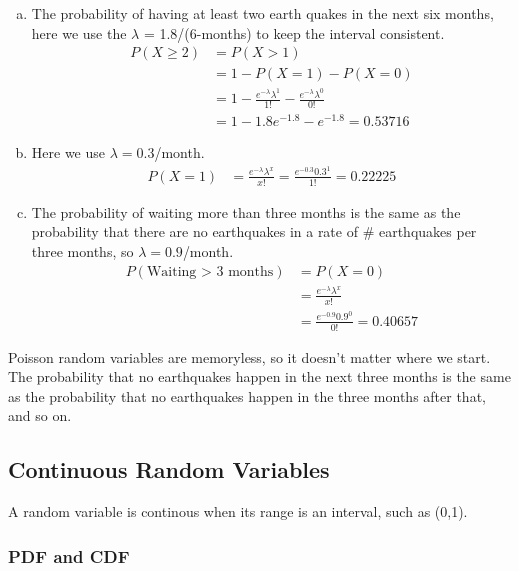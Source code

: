 \documentclass{article}
\begin{document}
\begin{enumerate}[(a)]
\item The probability of having at least two earth quakes in the next six months, here we use the $\lambda$ = 1.8/(6-months) to keep the interval consistent.
\begin{align*}
P(X \geq 2) & = P(X > 1) \\
& = 1 - P(X=1) - P(X = 0) \\
& = 1 - \frac{e^{-\lambda}\lambda^1}{1!} - \frac{e^{-\lambda}\lambda^0}{0!}\\
& = 1 - 1.8e^{-1.8} - e^{-1.8} = \boxed{0.53716}
\end{align*}
\item Here we use $\lambda=0.3$/month. \begin{align*} 
P(X = 1) & =  \frac{e^{-\lambda}\lambda^x}{x!} = \frac{e^{-0.3}0.3^1}{1!} = \boxed{0.22225}
\end{align*}
\item  The probability of waiting more than three months is the same as the probability that there are no earthquakes in a rate of \# earthquakes per three months, so $\lambda = 0.9$/month. \begin{align*} 
P(\text{Waiting > 3 months}) & =  P(X = 0) \\
& = \frac{e^{-\lambda}\lambda^x}{x!} \\
& = \frac{e^{-0.9}0.9^0}{0!} = \boxed{0.40657} 
\end{align*}
\end{enumerate}

Poisson random variables are memoryless, so it doesn't matter where we start. The probability that no earthquakes happen in the next three months is the same as the probability that no earthquakes happen in the three months after that, and so on.








\subsection{Continuous Random Variables}

A random variable is continous when its range is an interval, such as (0,1). 

\subsubsection{PDF and CDF}
\end{document}
